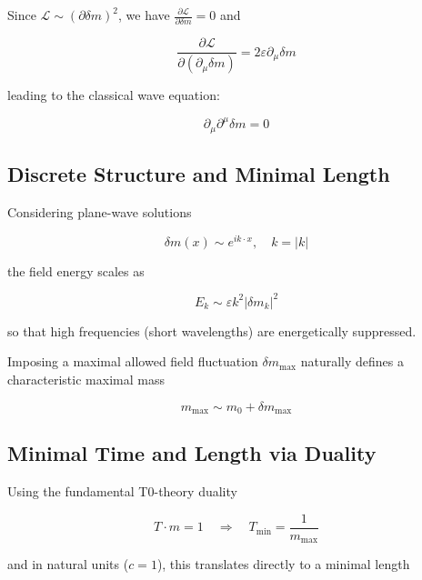 \documentclass[12pt,a4paper]{article}
\numberwithin{equation}{section}
\begin{document}
	Since $\mathcal{L} \sim (\partial \delta m)^2$, we have $\frac{\partial \mathcal{L}}{\partial \delta m} = 0$ and
	
	\begin{equation}
		\frac{\partial \mathcal{L}}{\partial (\partial_\mu \delta m)} = 2 \varepsilon \partial_\mu \delta m
	\end{equation}
	
	leading to the classical wave equation:
	
	\begin{equation}
		\partial_\mu \partial^\mu \delta m = 0
	\end{equation}
	
	\subsection{Discrete Structure and Minimal Length}
	
	Considering plane-wave solutions
	
	\begin{equation}
		\delta m(x) \sim e^{i k \cdot x}, \quad k = |k|
	\end{equation}
	
	the field energy scales as
	
	\begin{equation}
		E_k \sim \varepsilon k^2 |\delta m_k|^2
	\end{equation}
	
	so that high frequencies (short wavelengths) are energetically suppressed.  
	
	Imposing a maximal allowed field fluctuation $\delta m_{\mathrm{max}}$ naturally defines a characteristic maximal mass
	
	\begin{equation}
		m_{\mathrm{max}} \sim m_0 + \delta m_{\mathrm{max}}
	\end{equation}
	
	\subsection{Minimal Time and Length via Duality}
	
	Using the fundamental T0-theory duality
	
	\begin{equation}
		T \cdot m = 1 \quad \Rightarrow \quad T_{\mathrm{min}} = \frac{1}{m_{\mathrm{max}}}
	\end{equation}
	
	and in natural units ($c = 1$), this translates directly to a minimal length
	
\end{document}
